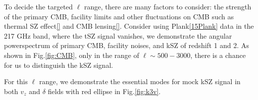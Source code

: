 To decide the targeted $\ell$ range, 
there are many factors to consider:  
the strength of the primary CMB, facility limits and 
other fluctuations on CMB such as thermal SZ effect\ref{} and CMB lensing\ref{}.
Consider using Plank\ref{15Plank} data 
in the 217 GHz band, where the tSZ signal vanishes, 
we demonstrate the angular powerspectrum of primary CMB, 
facility noises, 
and kSZ of redshift 1 and 2. 
As shown in Fig.\ref{fig:CMB}, 
only in the range of $\ell \sim 500-3000$, 
there is a chance for us to distinguish the kSZ signal.  

For this $\ell$ range, we demonstrate the essential modes 
for mock kSZ signal in both $v_z$ and $\delta$ fields with red ellipse 
in Fig.\ref{fig:k3v}. 

